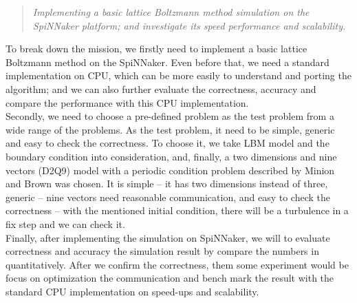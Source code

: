 \begin{quote}
\textit{Implementing a basic lattice Boltzmann method simulation on the SpiNNaker platform; and investigate its speed performance and scalability. \\
}\end{quote}



To break down the mission, we firstly need to implement a basic lattice Boltzmann method on the SpiNNaker. Even before that, we need a standard implementation on CPU, which can be more easily to understand and porting the algorithm; and we can also further evaluate the correctness, accuracy and compare the performance with this CPU implementation.\\

Secondly, we need to choose a pre-defined problem as the test problem from a wide range of the problems. As the test problem, it need to be simple, generic and easy to check the correctness. To choose it, we take LBM model and the boundary condition into consideration, and, finally, a two dimensions and nine vectors (D2Q9) model with a periodic condition problem described by Minion and Brown \cite{minion1997performance} was chosen. It is simple -- it has two dimensions instead of three, generic -- nine vectors need reasonable communication, and easy to check the correctness -- with the mentioned initial condition, there will be a turbulence in a fix step and we can check it.\\

Finally, after implementing the simulation on SpiNNaker, we will to evaluate correctness and accuracy the simulation result by compare the numbers in quantitatively. After we confirm the correctness, them some experiment would be focus on optimization the communication and bench mark the result with the standard CPU implementation on speed-ups and scalability.\\

